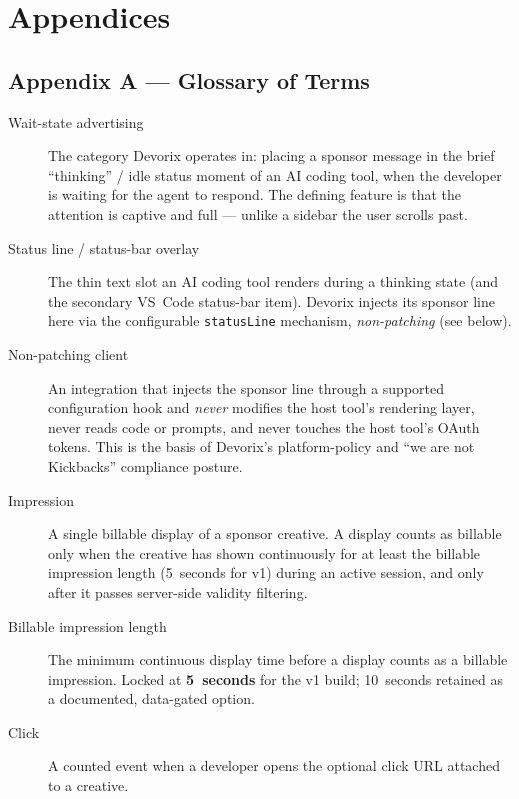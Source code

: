 \chapter{Appendices}
\label{ch:appendices}

\section{Appendix A --- Glossary of Terms}
\label{app:glossary}

\begin{description}
  \item[Wait-state advertising] The category Devorix operates in: placing a
        sponsor message in the brief ``thinking'' / idle status moment of an AI
        coding tool, when the developer is waiting for the agent to respond.
        The defining feature is that the attention is captive and full ---
        unlike a sidebar the user scrolls past.

  \item[Status line / status-bar overlay] The thin text slot an AI coding tool
        renders during a thinking state (and the secondary VS~Code status-bar
        item). Devorix injects its sponsor line here via the configurable
        \texttt{statusLine} mechanism, \emph{non-patching} (see below).

  \item[Non-patching client] An integration that injects the sponsor line
        through a supported configuration hook and \emph{never} modifies the
        host tool's rendering layer, never reads code or prompts, and never
        touches the host tool's OAuth tokens. This is the basis of Devorix's
        platform-policy and ``we are not Kickbacks'' compliance posture.

  \item[Impression] A single billable display of a sponsor creative. A display
        counts as billable only when the creative has shown continuously for at
        least the billable impression length (5~seconds for v1) during an
        active session, and only after it passes server-side validity
        filtering.

  \item[Billable impression length] The minimum continuous display time before
        a display counts as a billable impression. Locked at \textbf{5~seconds}
        for the v1 build; 10~seconds retained as a documented, data-gated
        option.

  \item[Click] A counted event when a developer opens the optional click URL
        attached to a creative.


\end{description}
